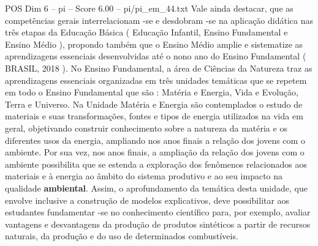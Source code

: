 \begin{textsample}{POS Dim 6 – pi – Score 6.00 – pi/pi\_em\_44.txt}
Vale ainda destacar, que as competências gerais interrelacionam -se e desdobram -se na aplicação didática nas três etapas da Educação Básica ( Educação Infantil, Ensino Fundamental e Ensino Médio ), propondo também que o Ensino Médio amplie e sistematize as aprendizagens essenciais desenvolvidas até o nono ano do Ensino Fundamental ( BRASIL, 2018 ).
No Ensino Fundamental, a área de Ciências da Natureza traz as aprendizagens essenciais organizadas em três unidades temáticas que se repetem em todo o Ensino Fundamental que são : Matéria e Energia, Vida e Evolução, Terra e Universo.
Na Unidade Matéria e Energia são contemplados o estudo de materiais e suas transformações, fontes e tipos de energia utilizados na vida em geral, objetivando construir conhecimento sobre a natureza da matéria e os diferentes usos da energia, ampliando nos anos finais a relação dos jovens com o ambiente.
Por sua vez, nos anos finais, a ampliação da relação dos jovens com o ambiente possibilita que se estenda a exploração dos fenômenos relacionados aos materiais e à energia ao âmbito do sistema produtivo e ao seu impacto na qualidade \textbf{ambiental}.
Assim, o aprofundamento da temática desta unidade, que envolve inclusive a construção de modelos explicativos, deve possibilitar aos estudantes fundamentar -se no conhecimento científico para, por exemplo, avaliar vantagens e desvantagens da produção de produtos sintéticos a partir de recursos naturais, da produção e do uso de determinados combustíveis.

\end{textsample}
